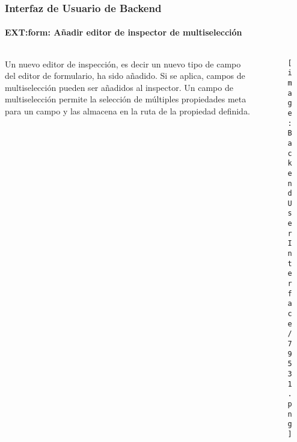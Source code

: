 \begin{frame}[fragile]
	\frametitle{Interfaz de Usuario de Backend}
	\framesubtitle{{EXT:form}: Añadir editor de inspector de multiselección}

	\begin{columns}[T]
		\begin{column}{0.35\textwidth}
			Un nuevo editor de inspección, es decir un nuevo tipo de campo del editor de formulario, ha sido añadido.
			Si se aplica, campos de multiselección pueden ser añadidos al inspector.
			Un campo de multiselección permite la selección de múltiples propiedades meta para un campo
			y las almacena en la ruta de la propiedad definida.
		\end{column}

		\begin{column}{0.65\textwidth}
			\begin{figure}\vspace*{-0.6cm}
				\texttt{[image: BackendUserInterface/79531.png]}
			\end{figure}
		\end{column}
	\end{columns}

\end{frame}

